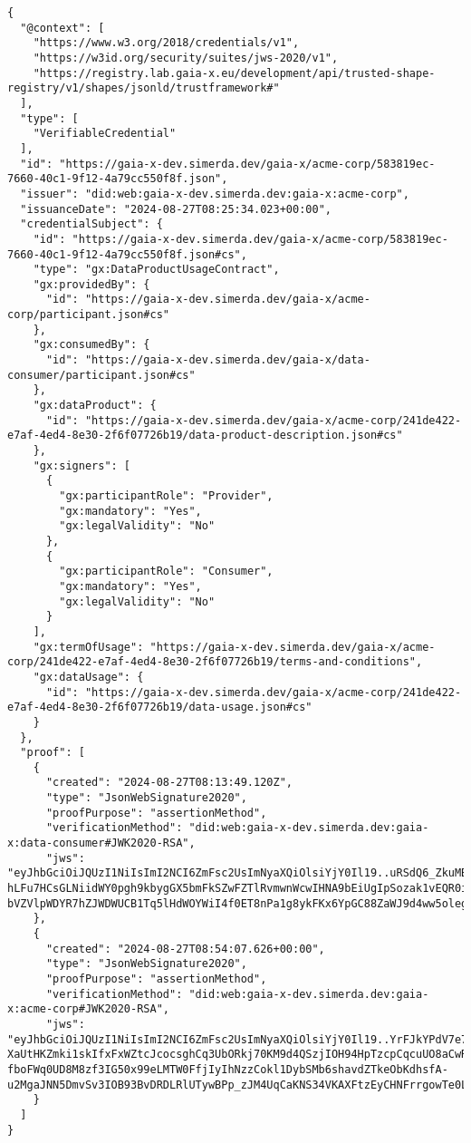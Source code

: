 \begin{verbatim}
{
  "@context": [
    "https://www.w3.org/2018/credentials/v1",
    "https://w3id.org/security/suites/jws-2020/v1",
    "https://registry.lab.gaia-x.eu/development/api/trusted-shape-registry/v1/shapes/jsonld/trustframework#"
  ],
  "type": [
    "VerifiableCredential"
  ],
  "id": "https://gaia-x-dev.simerda.dev/gaia-x/acme-corp/583819ec-7660-40c1-9f12-4a79cc550f8f.json",
  "issuer": "did:web:gaia-x-dev.simerda.dev:gaia-x:acme-corp",
  "issuanceDate": "2024-08-27T08:25:34.023+00:00",
  "credentialSubject": {
    "id": "https://gaia-x-dev.simerda.dev/gaia-x/acme-corp/583819ec-7660-40c1-9f12-4a79cc550f8f.json#cs",
    "type": "gx:DataProductUsageContract",
    "gx:providedBy": {
      "id": "https://gaia-x-dev.simerda.dev/gaia-x/acme-corp/participant.json#cs"
    },
    "gx:consumedBy": {
      "id": "https://gaia-x-dev.simerda.dev/gaia-x/data-consumer/participant.json#cs"
    },
    "gx:dataProduct": {
      "id": "https://gaia-x-dev.simerda.dev/gaia-x/acme-corp/241de422-e7af-4ed4-8e30-2f6f07726b19/data-product-description.json#cs"
    },
    "gx:signers": [
      {
        "gx:participantRole": "Provider",
        "gx:mandatory": "Yes",
        "gx:legalValidity": "No"
      },
      {
        "gx:participantRole": "Consumer",
        "gx:mandatory": "Yes",
        "gx:legalValidity": "No"
      }
    ],
    "gx:termOfUsage": "https://gaia-x-dev.simerda.dev/gaia-x/acme-corp/241de422-e7af-4ed4-8e30-2f6f07726b19/terms-and-conditions",
    "gx:dataUsage": {
      "id": "https://gaia-x-dev.simerda.dev/gaia-x/acme-corp/241de422-e7af-4ed4-8e30-2f6f07726b19/data-usage.json#cs"
    }
  },
  "proof": [
    {
      "created": "2024-08-27T08:13:49.120Z",
      "type": "JsonWebSignature2020",
      "proofPurpose": "assertionMethod",
      "verificationMethod": "did:web:gaia-x-dev.simerda.dev:gaia-x:data-consumer#JWK2020-RSA",
      "jws": "eyJhbGciOiJQUzI1NiIsImI2NCI6ZmFsc2UsImNyaXQiOlsiYjY0Il19..uRSdQ6_ZkuMBsu59VCqWyAlPNytVF9It338rsL7hDJYCPj-hLFu7HCsGLNiidWY0pgh9kbygGX5bmFkSZwFZTlRvmwnWcwIHNA9bEiUgIpSozak1vEQR0iyNB9cbB8jXNWbvpIEdHsl2nBorizWjXxx3aU2HcOWTXBVr0Qm_nDMpgHZ9Jbd_dxLYL5EVMOCf_NkEsrguYogJIjFjEJQFLVpmCRj7wmZJa_mgO8_-bVZVlpWDYR7hZJWDWUCB1Tq5lHdWOYWiI4f0ET8nPa1g8ykFKx6YpGC88ZaWJ9d4ww5olegTc2fr4xwYxMl3VXVuZndufuVhziSnf84CwYLSKQ"
    },
    {
      "created": "2024-08-27T08:54:07.626+00:00",
      "type": "JsonWebSignature2020",
      "proofPurpose": "assertionMethod",
      "verificationMethod": "did:web:gaia-x-dev.simerda.dev:gaia-x:acme-corp#JWK2020-RSA",
      "jws": "eyJhbGciOiJQUzI1NiIsImI2NCI6ZmFsc2UsImNyaXQiOlsiYjY0Il19..YrFJkYPdV7e7ykYrs6PnkEpDWIl3gBiUGhoSd6COpIr_7D6vjTa-XaUtHKZmki1skIfxFxWZtcJcocsghCq3UbORkj70KM9d4QSzjIOH94HpTzcpCqcuUO8aCwRaXAyuk9Ikz1KjoYJbLjzhXm1HX-fboFWq0UD8M8zf3IG50x99eLMTW0FfjIyIhNzzCokl1DybSMb6shavdZTkeObKdhsfA-u2MgaJNN5DmvSv3IOB93BvDRDLRlUTywBPp_zJM4UqCaKNS34VKAXFtzEyCHNFrrgowTe0LwAIElv8xQTrTafvCZUDUGoAwviAPMx16rpEG79NpiVjRYGflr1LzQ"
    }
  ]
}
\end{verbatim}


